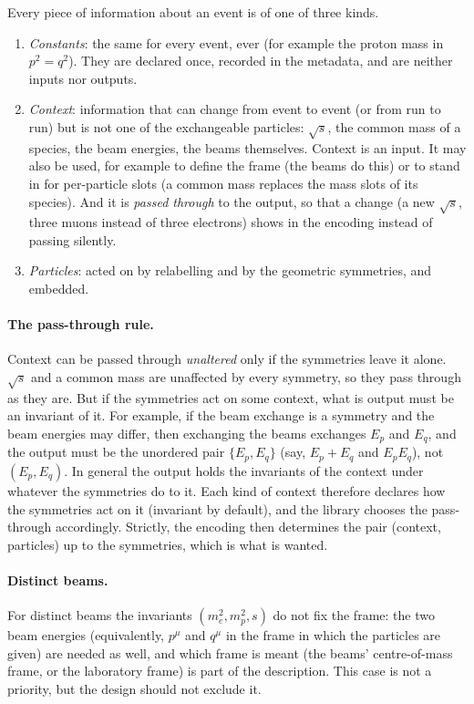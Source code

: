 \documentclass[11pt]{article}
\theoremstyle{definition}
\theoremstyle{remark}
\begin{document}
Every piece of information about an event is of one of three kinds.
\begin{enumerate}
  \item \emph{Constants}: the same for every event, ever (for example the
    proton mass in $p^2 = q^2$). They are declared once, recorded in the
    metadata, and are neither inputs nor outputs.
  \item \emph{Context}: information that can change from event to event (or
    from run to run) but is not one of the exchangeable particles: $\sqrt{s}$,
    the common mass of a species, the beam energies, the beams themselves.
    Context is an input. It may also be used, for example to define the frame
    (the beams do this) or to stand in for per-particle slots (a common mass
    replaces the mass slots of its species). And it is \emph{passed through} to
    the output, so that a change (a new $\sqrt{s}$, three muons instead of three
    electrons) shows in the encoding instead of passing silently.
  \item \emph{Particles}: acted on by relabelling and by the geometric
    symmetries, and embedded.
\end{enumerate}

\paragraph{The pass-through rule.}
Context can be passed through \emph{unaltered} only if the symmetries leave it
alone. $\sqrt{s}$ and a common mass are unaffected by every symmetry, so they
pass through as they are. But if the symmetries act on some context, what is
output must be an invariant of it. For example, if the beam exchange is a
symmetry and the beam energies may differ, then exchanging the beams exchanges
$E_p$ and $E_q$, and the output must be the unordered pair $\{E_p, E_q\}$ (say,
$E_p + E_q$ and $E_pE_q$), not $(E_p, E_q)$. In general the output holds the
invariants of the context under whatever the symmetries do to it. Each kind of
context therefore declares how the symmetries act on it (invariant by
default), and the library chooses the pass-through accordingly. Strictly, the
encoding then determines the pair (context, particles) up to the symmetries,
which is what is wanted.

\paragraph{Distinct beams.} For distinct beams the invariants $(m_e^2, m_p^2,
s)$ do not fix the frame: the two beam energies (equivalently, $p^\mu$ and
$q^\mu$ in the frame in which the particles are given) are needed as well, and
which frame is meant (the beams' centre-of-mass frame, or the laboratory frame)
is part of the description. This case is not a priority, but the design should
not exclude it.
\end{document}
